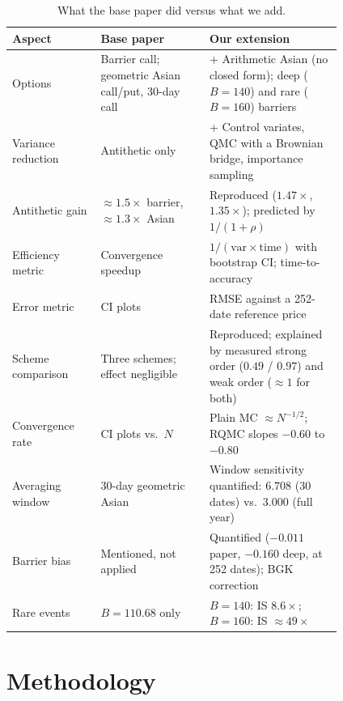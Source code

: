 \documentclass[sigconf]{acmart}
\begin{document}
\begin{table}[t]
\caption{What the base paper did versus what we add.}
\label{tab:what-we-add}
\small
\begin{tabular}{L{0.21\linewidth}L{0.27\linewidth}L{0.33\linewidth}}
\toprule
\textbf{Aspect} & \textbf{Base paper} & \textbf{Our extension} \\
\midrule
Options & Barrier call; geometric Asian call/put, 30-day call &
  + Arithmetic Asian (no closed form); deep ($B{=}140$) and rare ($B{=}160$) barriers \\
\midrule
Variance reduction & Antithetic only &
  + Control variates, QMC with a Brownian bridge, importance sampling \\
\midrule
Antithetic gain & $\approx1.5\times$ barrier, $\approx1.3\times$ Asian &
  Reproduced ($1.47\times$, $1.35\times$); predicted by $1/(1+\rho)$ \\
\midrule
Efficiency metric & Convergence speedup &
  $1/(\text{var}\times\text{time})$ with bootstrap CI; time-to-accuracy \\
\midrule
Error metric & CI plots & RMSE against a 252-date reference price \\
\midrule
Scheme comparison & Three schemes; effect negligible &
  Reproduced; explained by measured strong order ($0.49$ / $0.97$) and weak order ($\approx1$ for both) \\
\midrule
Convergence rate & CI plots vs.\ $N$ & Plain MC $\approx N^{-1/2}$; RQMC slopes $-0.60$ to $-0.80$ \\
\midrule
Averaging window & 30-day geometric Asian & Window sensitivity quantified: $6.708$ (30 dates) vs.\ $3.000$ (full year) \\
\midrule
Barrier bias & Mentioned, not applied & Quantified ($-0.011$ paper, $-0.160$ deep, at 252 dates); BGK correction \\
\midrule
Rare events & $B=110.68$ only & $B=140$: IS $8.6\times$; $B=160$: IS $\approx 49\times$ \\
\bottomrule
\end{tabular}
\end{table}

\section{Methodology}
\end{document}
